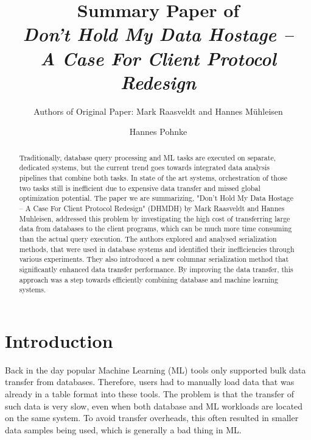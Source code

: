 \documentclass[sigconf]{acmart}
\begin{document}
\title{Summary Paper of \\ \textit{Don’t Hold My Data Hostage – \\A Case For Client Protocol Redesign}}
\subtitle{Authors of Original Paper: Mark Raasveldt and Hannes Mühleisen}


\author{Hannes Pohnke}


\begin{abstract}
Traditionally, database query processing and ML tasks are executed on separate, dedicated systems, but the current trend goes towards integrated data analysis pipelines that combine both tasks. In state of the art systems, orchestration of those two tasks still is inefficient due to expensive data transfer and missed global optimization potential. The paper we are summarizing, "Don’t Hold My Data Hostage – A Case For Client Protocol Redesign" (DHMDH) by Mark Raasveldt and Hannes Muhleisen, addressed this problem by investigating the high cost of transferring large data from databases to the client programs, which can be much more time consuming than the actual query execution. The authors explored and analysed serialization methods, that were used in database systems and identified their inefficiencies through various experiments. They also introduced a new columnar serialization method that significantly enhanced data transfer performance. By improving the data transfer, this approach was a step towards efficiently combining database and machine learning systems.
\end{abstract}


\maketitle

\section{Introduction}
Back in the day popular Machine Learning (ML) tools only supported bulk data transfer from databases. Therefore, users had to manually load data that was already in a table format into these tools. The problem is that the transfer of such data is very slow, even when both database and ML workloads are located on the same system. To avoid transfer overheads, this often resulted in smaller data samples being used, which is generally a bad thing in ML.
\end{document}
